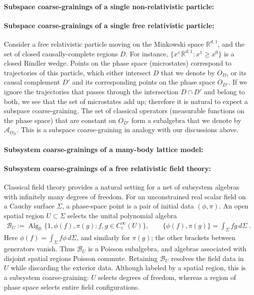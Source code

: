\documentclass[a4paper,11pt]{article}
\theoremstyle{definition}
\newcommand{\mA}{\mathcal{A}}
\begin{document}
\paragraph{Subspace coarse-grainings of a single non-relativistic particle:}


\paragraph{Subspace coarse-grainings of a single free relativistic particle:}
Consider a free relativistic particle moving on the Minkowski space $\mathbb{R}^{d,1}$, and the set of closed causally-complete regions $D$. For instance, $\{x^\in\mathbb{R}^{d,1}: x^1\geq x^0\}$ is a closed Rindler wedge. Points on the phase space (microstates) correspond to trajectories of this particle, which either intersect $D$ that we denote by $O_D$, or its causal complement $D'$ and its corresponding points on the phase space $O_{D'}$. If we ignore the trajectories that passes through the intersection $D\cap D'$ and belong to both, we see that the set of microstates add up; therefore it is natural to expect a subspace coarse-graining. The set of classical operators (measurable functions on the phase space) that are constant on $O_{D'}$ form a subalgebra that we denote by $\mA_{O_D}$. This is a subspace coarse-graining in analogy with our discussions above.

\paragraph{Subsystem coarse-grainings of a many-body lattice model:} 

\paragraph{Subsystem coarse-grainings of a free relativistic field theory:} Classical field theory provides a natural setting for a net of subsystem algebras with infinitely many degrees of freedom. For an unconstrained real scalar field on a Cauchy surface $\Sigma$, a phase-space point is a pair of initial data $(\phi,\pi)$. An open spatial region $U\subset\Sigma$ selects the unital polynomial algebra
\begin{align}
    \mathcal B_U
    :=\operatorname{Alg}_{\mathbb R}\{1,\phi(f),\pi(g):f,g\in C_c^\infty(U)\},
    \qquad
    \{\phi(f),\pi(g)\}=\int_\Sigma fg\,d\Sigma\ .
\end{align}
Here $\phi(f)=\int_\Sigma f\phi\,d\Sigma$, and similarly for $\pi(g)$; the other brackets between generators vanish. Thus $\mathcal B_U$ is a Poisson subalgebra, and algebras associated with disjoint spatial regions Poisson commute. Retaining $\mathcal B_U$ resolves the field data in $U$ while discarding the exterior data. Although labeled by a spatial region, this is a subsystem coarse-graining: $U$ selects degrees of freedom, whereas a region of phase space selects entire field configurations.
\end{document}
